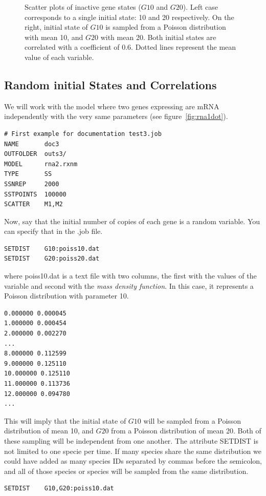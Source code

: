\documentclass[letterpaper]{article}
\begin{document}
\begin{figure}[H]
\begin{minipage}[b]{0.48\linewidth}
  \end{minipage}
  \caption{Scatter plots of inactive gene states ($G10$ and
    $G20$). Left case corresponds to a single initial state: 10 and 20
    respectively. On the right, initial state of $G10$ is sampled from
    a Poisson distribution with mean 10, and $G20$ with mean 20. Both
    initial states are correlated with a coefficient of 0.6. Dotted
    lines represent the mean value of each variable.}
  \label{fig:scatterG}
\end{figure}

\subsection{Random initial States and Correlations}

We will work with the model where two genes expressing are mRNA
independently with the very same parameters (see
figure~\ref{fig:rna1dot}).
{\footnotesize
\begin{verbatim}
# First example for documentation test3.job
NAME       doc3
OUTFOLDER  outs3/
MODEL      rna2.rxnm
TYPE       SS
SSNREP     2000
SSTPOINTS  100000
SCATTER    M1,M2
\end{verbatim}
}
Now, say that the initial number of copies of each gene is a random
variable. You can specify that in the \textsf{.job} file.
{\footnotesize
\begin{verbatim}
SETDIST    G10:poiss10.dat
SETDIST    G20:poiss20.dat
\end{verbatim}
}
where \textsf{poiss10.dat} is a text file with two columns, the first
with the values of the variable and second with the \emph{mass density
  function}. In this case, it represents a Poisson distribution with
parameter 10.
{\footnotesize
\begin{verbatim}
0.000000 0.000045
1.000000 0.000454
2.000000 0.002270
...
8.000000 0.112599
9.000000 0.125110
10.000000 0.125110
11.000000 0.113736
12.000000 0.094780
...
\end{verbatim}
}
This will imply that the initial state of $G10$ will be sampled from a
Poisson distribution of mean 10, and $G20$ from a Poisson distribution
of mean 20. Both of these sampling will be independent from one
another. 
The attribute SETDIST is not limited to one specie per time. If many
species share the same distribution we could have added as many
species IDs separated by commas before the semicolon, and all of those
species or species will be sampled from the same distribution.
{\footnotesize
\begin{verbatim}
SETDIST    G10,G20:poiss10.dat
\end{verbatim}
}
\end{document}
